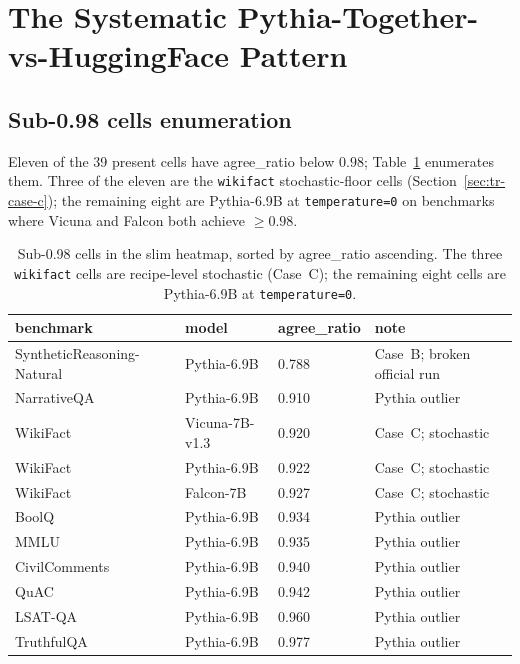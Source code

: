 \documentclass[11pt]{article}
\begin{document}
\section{The Systematic Pythia-Together-vs-HuggingFace Pattern}
\label{sec:tr-pythia-pattern}

\subsection{Sub-0.98 cells enumeration}
\label{sec:tr-pythia-sub98}

Eleven of the 39 present cells have agree\_ratio below $0.98$;
  Table~\ref{tab:tr-sub98} enumerates them.
Three of the eleven are the \texttt{wikifact} stochastic-floor cells
  (Section~\ref{sec:tr-case-c}); the remaining eight are
  Pythia-6.9B at \texttt{temperature=0} on benchmarks where Vicuna
  and Falcon both achieve $\geq 0.98$.

\begin{table}[htbp]
\centering
\small
\caption{Sub-0.98 cells in the slim heatmap, sorted by
  agree\_ratio ascending.
The three \texttt{wikifact} cells are recipe-level stochastic
  (Case~C); the remaining eight cells are Pythia-6.9B at
  \texttt{temperature=0}.}
\label{tab:tr-sub98}
\begin{tabular}{llll}
\toprule
benchmark & model & agree\_ratio & note \\
\midrule
SyntheticReasoning-Natural & Pythia-6.9B           & 0.788 & Case~B; broken official run \\
NarrativeQA                & Pythia-6.9B           & 0.910 & Pythia outlier \\
WikiFact                   & Vicuna-7B-v1.3        & 0.920 & Case~C; stochastic \\
WikiFact                   & Pythia-6.9B           & 0.922 & Case~C; stochastic \\
WikiFact                   & Falcon-7B             & 0.927 & Case~C; stochastic \\
BoolQ                      & Pythia-6.9B           & 0.934 & Pythia outlier \\
MMLU                       & Pythia-6.9B           & 0.935 & Pythia outlier \\
CivilComments              & Pythia-6.9B           & 0.940 & Pythia outlier \\
QuAC                       & Pythia-6.9B           & 0.942 & Pythia outlier \\
LSAT-QA                    & Pythia-6.9B           & 0.960 & Pythia outlier \\
TruthfulQA                 & Pythia-6.9B           & 0.977 & Pythia outlier \\
\bottomrule
\end{tabular}
\end{table}
\end{document}
